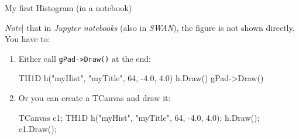 \documentclass[aspectratio=169]{beamer}
\begin{document}
\begin{frame}[fragile]{My first Histogram (in a notebook)}

    \textit{Note}| that in \textit{Jupyter notebooks} (also in \textit{SWAN}), the figure is not shown directly. You have to:
    \vspace{5mm}

    \begin{enumerate}
        \item Either call \texttt{gPad->Draw()} at the end:

              \begin{cppcell}
TH1D h("myHist", "myTitle", 64, -4.0, 4.0)
h.Draw()
gPad->Draw()
              \end{cppcell}

        \item Or you can create a TCanvas and draw it:

              \begin{cppcell}
TCanvas c1;
TH1D h("myHist", "myTitle", 64, -4.0, 4.0);
h.Draw();
c1.Draw();
              \end{cppcell}

    \end{enumerate}

\end{frame}
\end{document}
